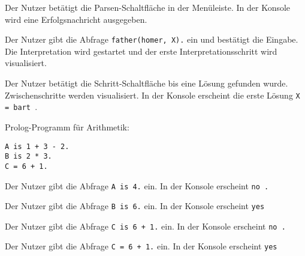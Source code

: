 \documentclass[parskip=full,11pt,twoside]{scrartcl}
\begin{document}
\begin{minipage}{\linewidth}
\end{minipage}


{Der Nutzer betätigt die Parsen-Schaltfläche in der Menüleiste.}
{In der Konsole wird eine Erfolgsnachricht ausgegeben.}

{Der Nutzer gibt die Abfrage \texttt{father(homer, X).} ein und bestätigt die Eingabe.}
{Die Interpretation wird gestartet und der erste Interpretationsschritt wird visualisiert.}

{Der Nutzer betätigt die Schritt-Schaltfläche bis eine Lösung gefunden wurde.}
{Zwischenschritte werden visualisiert. In der Konsole erscheint die erste Lösung \texttt{X = bart }.}


Prolog-Programm für Arithmetik:
\label{tst:maths_prog}
\begin{lstlisting}
A is 1 + 3 - 2.
B is 2 * 3.
C = 6 + 1.
\end{lstlisting}

{Der Nutzer gibt die Abfrage \texttt{A is 4.} ein.}
{In der Konsole erscheint \texttt{no .}}

{Der Nutzer gibt die Abfrage \texttt{B is 6.} ein.}
{In der Konsole erscheint \texttt{yes}}

{Der Nutzer gibt die Abfrage \texttt{C is 6 + 1.} ein.}
{In der Konsole erscheint \texttt{no .}}

{Der Nutzer gibt die Abfrage \texttt{C = 6 + 1.} ein.}
{In der Konsole erscheint \texttt{yes}}
\end{document}
